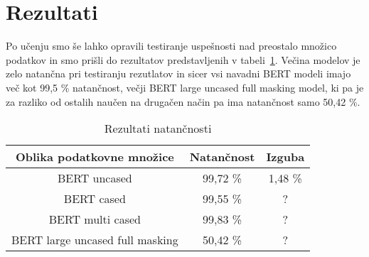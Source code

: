 \documentclass[sigconf,nonacm]{acmart}
\begin{document}
\section{Rezultati}
Po učenju smo še lahko opravili testiranje uspešnosti nad preostalo množico podatkov in smo prišli do rezultatov predstavljenih v tabeli~\ref{tab:table2}. Večina modelov je zelo natančna pri testiranju rezutlatov in sicer vsi navadni BERT modeli imajo več kot 99,5 \% natančnost, večji BERT large uncased full masking model, ki pa je za razliko od ostalih naučen na drugačen način pa ima natančnost samo 50,42 \%.

\begin{table}
    \centering
    \caption{Rezultati natančnosti}
    \label{tab:table2}
    \begin{tabular}{ccc}
        	\toprule
        	Oblika podatkovne množice&Natančnost&Izguba\\
       	 \midrule
        	BERT uncased & 99,72 \% & 1,48 \%  \\
       	BERT cased &  99,55 \% & ? \\
	BERT multi cased & 99,83 \% & ?  \\
	BERT large uncased full masking  &  50,42 \% & ? \\
       	 \bottomrule
    \end{tabular}
\end{table}



\end{document}
